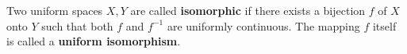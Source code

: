 Two uniform spaces $X, Y$ are called \textbf{isomorphic} if there exists a bijection $f$ of $X$ onto $Y$ such that both $f$ and $f^{-1}$ are uniformly continuous. The mapping $f$ itself is called a \textbf{uniform isomorphism}.
